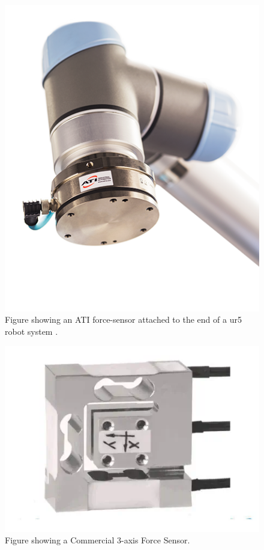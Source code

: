 \begin{figure}[p]%
	\centering
	\includegraphics[height=0.5\textheight]{figures/ch2/ati}
	\caption{Figure showing an ATI force-sensor attached to the end of a \ac{ur}5 robot system \cite{atipiclink}.}
	\label{fig:atifs}
\end{figure}

\begin{figure}[p]%
	\centering
	\includegraphics[width=12cm]{figures/ch2/commercialloadcell}
	\caption{Figure showing a Commercial 3-axis Force Sensor.}
	\label{fig:comfs}
\end{figure}

